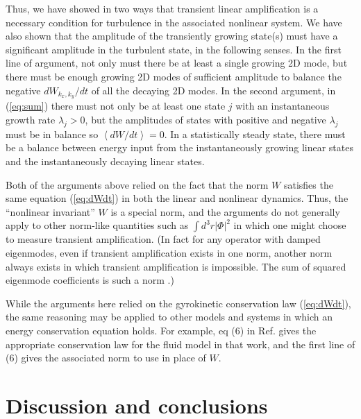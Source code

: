\documentclass[12pt,superscriptaddress]{revtex4}
\begin{document}
Thus, we have showed in two ways that transient linear amplification is a necessary
condition for turbulence in the associated nonlinear system.  We have also shown that the amplitude of the
transiently growing state(s) must have a significant amplitude in the turbulent state, in the following senses.
In the first line of argument, not only must there be at least a single growing 2D mode,
but there must be enough growing 2D modes of sufficient amplitude to balance the negative $dW_{k_x,k_y}/dt$
of all the decaying 2D modes.
In the second argument, in (\ref{eq:sum})
there must not only be at least one state $j$ with an instantaneous growth rate
$\lambda_j >0$, but the amplitudes of states with positive and negative
$\lambda_j$ must be in balance so $\left< dW/dt \right>=0$. In a statistically steady state, there must be a balance between energy input from the instantaneously growing
linear states and the instantaneously decaying linear states.

Both of the arguments above relied on the fact that the norm $W$ satisfies the same equation
(\ref{eq:dWdt}) in both the linear and nonlinear dynamics.
Thus, the ``nonlinear invariant'' $W$ is a special norm, and the arguments do not generally apply to other norm-like quantities
such as $\int d^3r \left| \Phi \right|^2$ in which one might choose to measure transient amplification.
(In fact for any operator with damped eigenmodes,
even if transient amplification exists in one norm,
another norm always exists in which transient amplification is impossible.
The sum of squared eigenmode coefficients is such a norm \cite{FarrellIoannou1993}.)


While the arguments here relied on the gyrokinetic conservation law (\ref{eq:dWdt}), the same reasoning may be applied to
other models and systems in which an energy conservation equation holds. For example,
eq (6) in Ref. \cite{Drake} gives the appropriate conservation law for the fluid model
in that work, and the first line of (6) gives the associated norm to use in place of $W$.


\section{Discussion and conclusions}
\label{sec:conclusions}
\end{document}

